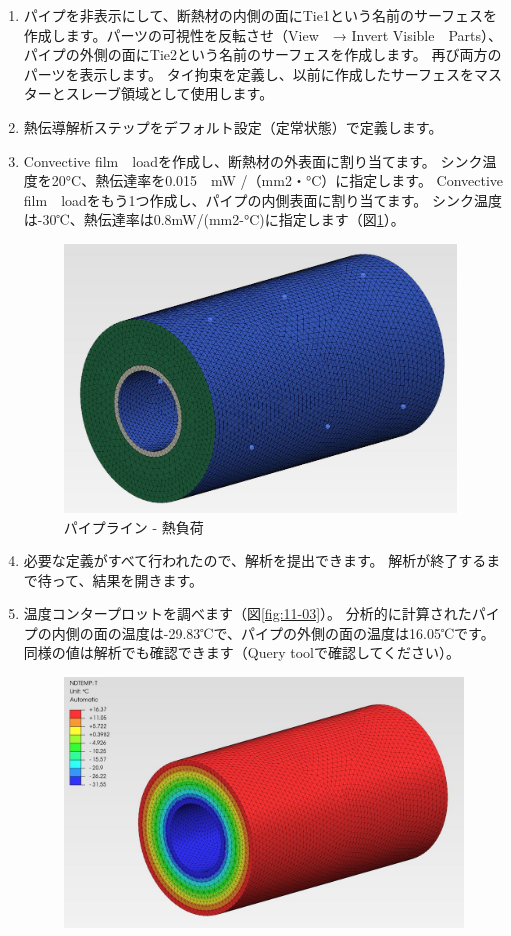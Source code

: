 \begin{enumerate}
\item
  パイプを非表示にして、断熱材の内側の面にTie1という名前のサーフェスを作成します。パーツの可視性を反転させ（View　→ Invert Visible　Parts）、パイプの外側の面にTie2という名前のサーフェスを作成します。
  再び両方のパーツを表示します。
  タイ拘束を定義し、以前に作成したサーフェスをマスターとスレーブ領域として使用します。
\item
  熱伝導解析ステップをデフォルト設定（定常状態）で定義します。
\item
  Convective film　loadを作成し、断熱材の外表面に割り当てます。
  シンク温度を20°C、熱伝達率を0.015　mW /（mm2・°C）に指定します。
  Convective film　loadをもう1つ作成し、パイプの内側表面に割り当てます。
  シンク温度は-30℃、熱伝達率は0.8mW/(mm2-°C)に指定します（図\ref{fig:11-02}）。
  	\vspace{-.3\baselineskip}
	\begin{figure}[H]
	\centering
	\includegraphics[width=104mm]{fig/11-02.png}
	\caption{パイプライン - 熱負荷}
	\label{fig:11-02}
	\end{figure}
	\vspace{-\baselineskip}
\item
  必要な定義がすべて行われたので、解析を提出できます。
  解析が終了するまで待って、結果を開きます。
\item
  温度コンタープロットを調べます（図\ref{fig:11-03}）。
  分析的に計算されたパイプの内側の面の温度は-29.83℃で、パイプの外側の面の温度は16.05℃です。
  同様の値は解析でも確認できます（Query toolで確認してください）。
  	\vspace{-.3\baselineskip}
	\begin{figure}[H]
	\centering
	\includegraphics[width=128mm]{fig/11-03.png}

\end{figure}
\end{enumerate}
